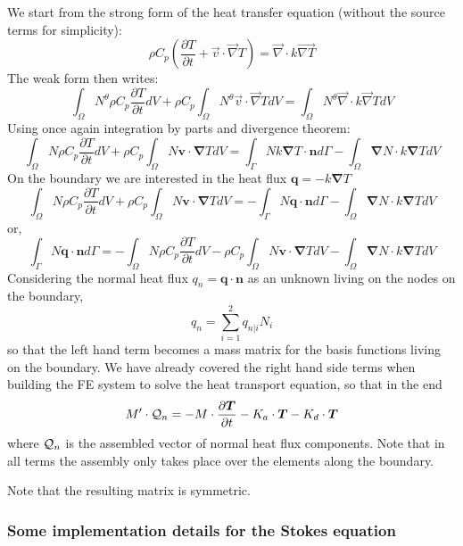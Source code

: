 We start from the strong form of the heat transfer equation (without the source terms for simplicity):
\[
\rho C_p
\left(\frac{\partial T}{\partial t} + \vec{v}\cdot \vec{\nabla}T\right)
=
\vec{\nabla} \cdot k\vec{\nabla T}
\]
The weak form then writes:
\[
\int_\Omega N^\theta
\rho C_p
\frac{\partial T}{\partial t} dV 
+
\rho C_p
\int_\Omega N^\theta
\vec{v}\cdot \vec{\nabla}T  dV
=
\int_\Omega N^\theta
\vec{\nabla} \cdot k\vec{\nabla} T dV
\]
Using once again integration by parts and divergence theorem:
\[
\int_\Omega N
\rho C_p
\frac{\partial T}{\partial t} dV 
+
\rho C_p
\int_\Omega N
 {\bm v}\cdot {\bm \nabla}T  dV
=
\int_\Gamma N k {\bm \nabla T} \cdot {\bm n} d\Gamma
-
\int_\Omega  {\bm \nabla} N \cdot k{\bm \nabla T} dV
\]
On the boundary we are interested in the heat flux ${\bm q}=-k {\bm \nabla T}$
\[
\int_\Omega N
\rho C_p
\frac{\partial T}{\partial t} dV 
+
\rho C_p
\int_\Omega N
 {\bm v}\cdot {\bm \nabla}T  dV
=
-\int_\Gamma N {\bm q} \cdot {\bm n} d\Gamma
- \int_\Omega  {\bm \nabla} N \cdot k{\bm \nabla T} dV
\]
or,
\[
\int_\Gamma N {\bm q} \cdot {\bm n} d\Gamma
=
-\int_\Omega N
\rho C_p
\frac{\partial T}{\partial t} dV 
-\rho C_p
\int_\Omega N
 {\bm v}\cdot {\bm \nabla}T  dV
- \int_\Omega  {\bm \nabla} N \cdot k{\bm \nabla T} dV
\]
Considering the normal heat flux $q_n = {\bm q} \cdot {\bm n}$ as an unknown 
living on the nodes on the boundary, 
\[
q_n = \sum_{i=1}^2 q_{n|i} N_i
\]
so that the left hand term becomes a mass matrix for the basis functions living on 
the boundary.
We have already covered the right hand side terms when building the FE system 
to solve the heat transport equation, so that in the end 
\[
M' \cdot {\cal Q}_n =
- M \cdot \frac{\partial \bm T}{\partial t} -K_a \cdot {\bm T} - K_d \cdot {\bm T} 
\]
where ${\cal Q}_n$ is the assembled vector of normal heat flux components.
Note that in all terms the assembly only takes place over the elements along the boundary.


Note that the resulting matrix is symmetric.


\subsubsection{Some implementation details for the Stokes equation}

